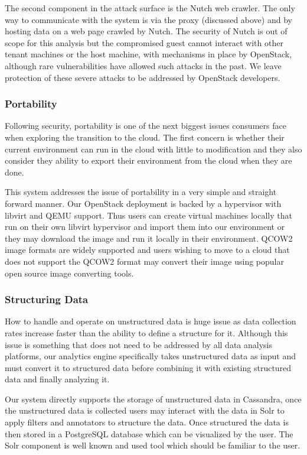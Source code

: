 The second component in the attack surface is the Nutch web crawler. The
only way to communicate with the system is via the proxy (discussed
above) and by hosting data on a web page crawled by Nutch. The security
of Nutch is out of scope for this analysis but the compromised guest
cannot interact with other tenant machines or the host machine, with
mechanisms in place by OpenStack, although rare vulnerabilities have
allowed such attacks in the past. We leave protection of these severe
attacks to be addressed by OpenStack developers.

\subsubsection{Portability}
\label{sec:portability}
Following security, portability is one of the next biggest issues
consumers face when exploring the transition to the cloud. The first
concern is whether their current environment can run in the cloud with
little to modification and they also consider they ability to export
their environment from the cloud when they are done.

This system addresses the issue of portability in a very simple and
straight forward manner. Our OpenStack deployment is backed by a
hypervisor with libvirt and QEMU support. Thus users can create virtual
machines locally that run on their own libvirt hypervisor and import
them into our environment or they may download the image and run it
locally in their environment. QCOW2 image formats are widely supported
and users wishing to move to a cloud that does not support the QCOW2
format may convert their image using popular open source image
converting tools.

\subsubsection{Structuring Data}
\label{sec:structuring}
How to handle and operate on unstructured data is huge issue as data
collection rates increase faster than the ability to define a structure
for it. Although this issue is something that does not need to be
addressed by all data analysis platforms, our analytics engine
specifically takes unstructured data as input and must convert it to
structured data before combining it with existing structured data and
finally analyzing it.

Our system directly supports the storage of unstructured data in
Cassandra, once the unstructured data is collected users may interact
with the data in Solr to apply filters and annotators to structure the
data. Once structured the data is then stored in a PostgreSQL database
which can be visualized by the user. The Solr component is well known
and used tool which should be familiar to the user.


